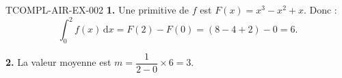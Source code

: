 \begin{corrige}{TCOMPL-AIR-EX-002}
\textbf{1.} Une primitive de $f$ est $F(x) = x^3-x^2+x$. Donc :
\[
  \int_0^2 f(x)\,\mathrm{d}x = F(2)-F(0) = (8-4+2) - 0 = 6.
\]

\textbf{2.} La valeur moyenne est $m = \dfrac{1}{2-0}\times6 = 3$.
\end{corrige}
